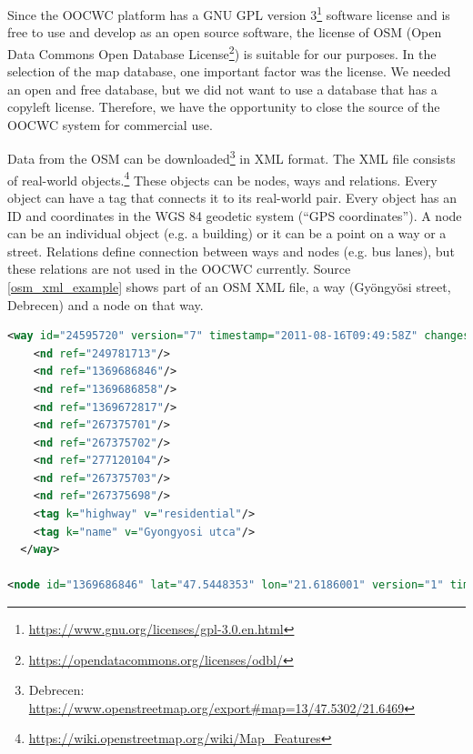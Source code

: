 \documentclass[b5paper,12pt]{report}
\theoremstyle{definition}
\begin{document}
Since the OOCWC platform has a GNU GPL version 3\footnote{\url{https://www.gnu.org/licenses/gpl-3.0.en.html}} software license and is free to use and develop as an open source software, the license of OSM (Open Data Commons Open Database License\footnote{\url{https://opendatacommons.org/licenses/odbl/}}) is suitable for our purposes. In the selection of the map database, one important factor was the license. We needed an open and free database, but we did not want to use a database that has a copyleft license. Therefore, we have the opportunity to close the source of the OOCWC system for commercial use.

Data from the OSM can be downloaded\footnote{Debrecen: \url{https://www.openstreetmap.org/export#map=13/47.5302/21.6469}} in XML format. The XML file consists of real-world objects.\footnote{\url{https://wiki.openstreetmap.org/wiki/Map_Features}} These objects can be nodes, ways and relations. Every object can have a tag that connects it to its real-world pair. Every object has an ID and coordinates in the WGS 84 geodetic system (\enquote{GPS coordinates}). A node can be an individual object (e.g. a building) or it can be a point on a way or a street. Relations define connection between ways and nodes (e.g. bus lanes), but these relations are not used in the OOCWC currently. Source \ref{osm_xml_example} shows part of an OSM XML file, a way (Gyöngyösi street, Debrecen) and a node on that way.

\begin{lstlisting}[language=XML,caption=Short example of OSM XML with a way in Debrecen (Gyöngyösi street) and a node on that way., label=osm_xml_example]
<way id="24595720" version="7" timestamp="2011-08-16T09:49:58Z" changeset="9033539" uid="247611" user="SzPaula">
    <nd ref="249781713"/>
    <nd ref="1369686846"/>
    <nd ref="1369686858"/>
    <nd ref="1369672817"/>
    <nd ref="267375701"/>
    <nd ref="267375702"/>
    <nd ref="277120104"/>
    <nd ref="267375703"/>
    <nd ref="267375698"/>
    <tag k="highway" v="residential"/>
    <tag k="name" v="Gyongyosi utca"/>
  </way>

<node id="1369686846" lat="47.5448353" lon="21.6186001" version="1" timestamp="2011-07-22T06:58:20Z" changeset="8794632" uid="493626" user="tamaas"/>
\end{lstlisting}
\end{document}
